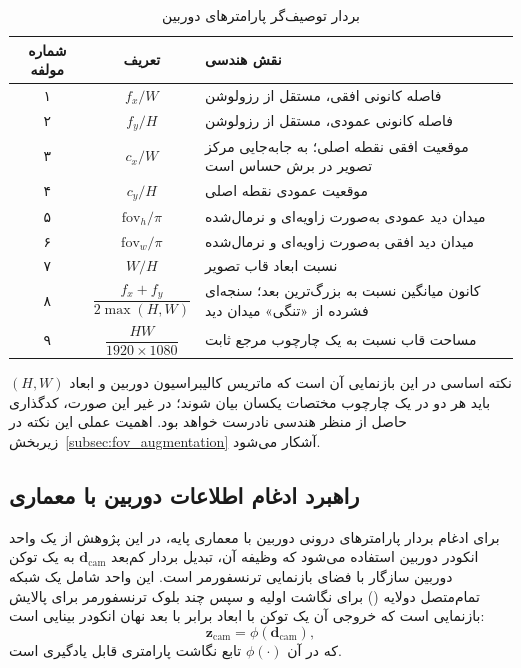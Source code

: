 \begin{table}[htbp]
\centering
\caption{بردار توصیف‌گر پارامترهای دوربین}
\label{tab:camera_descriptor}
\small
\renewcommand{\arraystretch}{1.35}
\begin{tabularx}{\textwidth}{@{}c c >{\raggedleft\arraybackslash}X@{}}
\toprule
شماره مولفه & تعریف & نقش هندسی \\ \midrule
۱ & $f_x/W$ & فاصله کانونی افقی، مستقل از رزولوشن \\
۲ & $f_y/H$ & فاصله کانونی عمودی، مستقل از رزولوشن \\
۳ & $c_x/W$ & موقعیت افقی نقطه اصلی؛ به جابه‌جایی مرکز تصویر در برش حساس است \\
۴ & $c_y/H$ & موقعیت عمودی نقطه اصلی \\
۵ & $\mathrm{fov}_h/\pi$ & میدان دید عمودی به‌صورت زاویه‌ای و نرمال‌شده \\
۶ & $\mathrm{fov}_w/\pi$ & میدان دید افقی به‌صورت زاویه‌ای و نرمال‌شده \\
۷ & $W/H$ & نسبت ابعاد قاب تصویر \\
۸ & $\dfrac{f_x+f_y}{2\max(H,W)}$ & کانون میانگین نسبت به بزرگ‌ترین بعد؛ سنجه‌ای فشرده از «تنگی» میدان دید \\
۹ & $\dfrac{HW}{1920\times1080}$ & مساحت قاب نسبت به یک چارچوب مرجع ثابت \\
\bottomrule
\end{tabularx}
\end{table}
 نکته اساسی در این بازنمایی آن است که ماتریس کالیبراسیون دوربین و ابعاد $(H, W)$ باید هر دو در یک چارچوب مختصات یکسان بیان شوند؛ در غیر این صورت، کدگذاری حاصل از منظر هندسی نادرست خواهد بود. اهمیت عملی این نکته در زیربخش~{\ref{subsec:fov_augmentation}} آشکار می‌شود.

\subsection{راهبرد ادغام اطلاعات دوربین با معماری }
\label{subsec:camera_integration}

برای ادغام بردار پارامترهای درونی دوربین با معماری پایه، در این پژوهش از یک واحد انکودر دوربین استفاده می‌شود که وظیفه آن، تبدیل بردار کم‌بعد $\mathbf{d}_{\mathrm{cam}}$ به یک توکن دوربین سازگار با فضای بازنمایی ترنسفورمر است. این واحد شامل یک شبکه تمام‌متصل دولایه () برای نگاشت اولیه و سپس چند بلوک ترنسفورمر برای پالایش بازنمایی است که خروجی آن یک توکن با ابعاد برابر با بعد نهان انکودر بینایی است:
\begin{equation}
\mathbf{z}_{\mathrm{cam}} = \phi(\mathbf{d}_{\mathrm{cam}}),
\end{equation}
که در آن $\phi(\cdot)$ تابع نگاشت پارامتری قابل یادگیری است.

